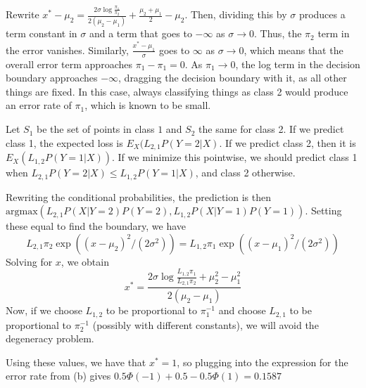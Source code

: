 \documentclass{article}
\newcommand{\nc}{\newcommand}
\begin{document}
Rewrite $x^*-\mu_2=\frac{2\sigma\log\frac{\pi_1}{\pi_2}}{2(\mu_2-\mu_1)}+\frac{\mu_2+\mu_1}{2}-\mu_2$. Then, dividing this by $\sigma$ produces a term constant in $\sigma$ and a term that goes to $-\infty$ as $\sigma\to0$. Thus, the $\pi_2$ term in the error vanishes. Similarly, $\frac{x^*-\mu_1}{\sigma}$ goes to $\infty$ as $\sigma\to0$, which means that the overall error term approaches $\pi_1-\pi_1=0$.
As $\pi_1\to0$, the log term in the decision boundary approaches $-\infty$, dragging the decision boundary with it, as all other things are fixed. In this case, always classifying things as class 2 would produce an error rate of $\pi_1$, which is known to be small.
{
\nc{\lot}{L_{1,2}}
\nc{\lto}{L_{2,1}}
Let $S_1$ be the set of points in class $1$ and $S_2$ the same for class 2. If we predict class 1, the expected loss is $E_X(\lto P(Y=2|X)$. If we predict class 2, then it is $E_X(\lot P(Y=1|X))$. If we minimize this pointwise, we should predict class 1 when $\lto P(Y=2|X)\leq\lot P(Y=1|X)$, and class 2 otherwise.

Rewriting the conditional probabilities, the prediction is then $\text{argmax}\left(\lto P(X|Y=2)P(Y=2), \lot P(X|Y=1)P(Y=1)\right)$. Setting these equal to find the boundary, we have
\[\lto \pi_2\exp\left((x-\mu_2)^2/(2\sigma^2)\right)=\lot\pi_1\exp\left((x-\mu_1)^2/(2\sigma^2)\right)\]
Solving for $x$, we obtain
\[x^*=\frac{2\sigma\log\frac{\lot\pi_1}{\lto\pi_2}+\mu_2^2-\mu_1^2}{2(\mu_2-\mu_1)}\]
Now, if we choose $\lot$ to be proportional to $\pi_1^{-1}$ and choose $\lto$ to be proportional to $\pi_2^{-1}$ (possibly with different constants), we will avoid the degeneracy problem.
}
Using these values, we have that $x^*=1$, so plugging into the expression for the error rate from (b) gives $0.5\Phi(-1)+0.5-0.5\Phi(1)=0.1587$
\end{document}
